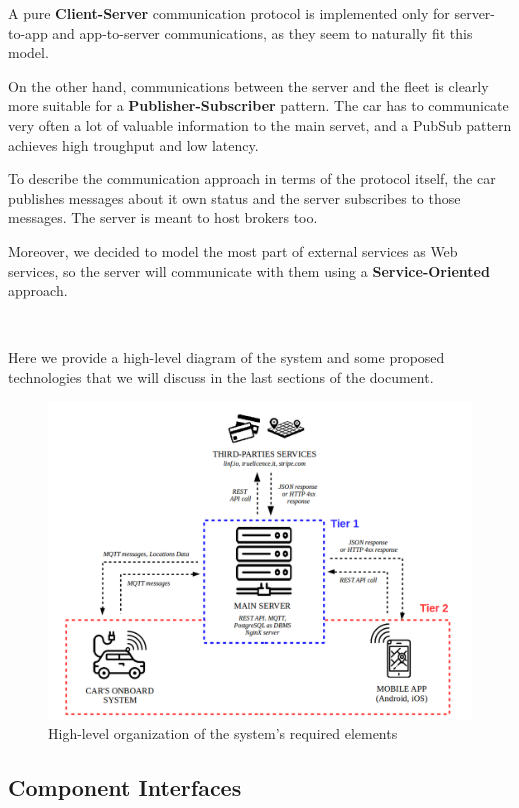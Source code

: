 \documentclass[11pt]{article} %
\begin{document}
\begin{description}
A pure \textbf{Client-Server} communication protocol is implemented only for server-to-app and app-to-server communications, as they seem to naturally fit this model.

On the other hand, communications between the server and the fleet is clearly more suitable for a \textbf{Publisher-Subscriber} pattern. The car has to communicate very often a lot of valuable information to the main servet, and a PubSub pattern achieves high troughput and low latency.
 
To describe the communication approach in terms of the protocol itself, the car publishes messages about it own status and the server subscribes to those messages. The server is meant to host brokers too.

Moreover, we decided to model the most part of external services as Web services, so the server will communicate with them using a \textbf{Service-Oriented} approach.

\hfill\

Here we provide a high-level diagram of the system and some proposed technologies that we will discuss in the last sections of  the document.


\begin{figure}[H]
	\centering
	\includegraphics[width=1\textwidth]{proposed_system.png}
	\caption{High-level organization of the system's required elements}
\end{figure}





\subsection{Component Interfaces}


\end{description}
\end{document}
